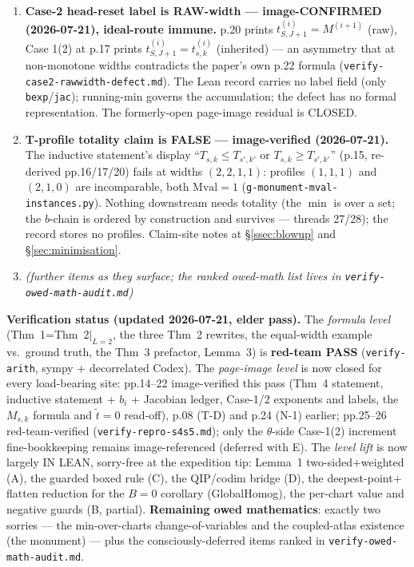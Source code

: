 \documentclass[11pt]{article}
\theoremstyle{plain}
\theoremstyle{definition}
\theoremstyle{remark}
\newcommand{\rorder}{\theta}         %
\newcommand{\Mval}{\mathrm{Mval}}
\begin{document}
\begin{enumerate}
\item[(T-E)] \textbf{Case-2 head-reset label is RAW-width --- image-CONFIRMED
(2026-07-21), ideal-route immune.} p.20 prints $t^{(i)}_{S,J+1}=M^{(i+1)}$ (raw), Case
1(2) at p.17 prints $t^{(i)}_{S,J+1}=t^{(i)}_{s,k}$ (inherited) --- an asymmetry that at
non-monotone widths contradicts the paper's own p.22 formula
(\texttt{verify-case2-rawwidth-defect.md}). The Lean record carries no label field
(only \texttt{bexp}/\texttt{jac}); running-min governs the accumulation; the defect has
no formal representation. The formerly-open page-image residual is CLOSED.
\item[(T-F)] \textbf{T-profile totality claim is FALSE --- image-verified (2026-07-21).}
The inductive statement's display ``$T_{s,k}\le T_{s',k'}$ or $T_{s,k}\ge T_{s',k'}$''
(p.15, re-derived pp.16/17/20) fails at widths $(2,2,1,1)$: profiles $(1,1,1)$ and
$(2,1,0)$ are incomparable, both $\Mval=1$ (\texttt{g-monument-mval-instances.py}).
Nothing downstream needs totality (the $\min$ is over a set; the $b$-chain is ordered by
construction and survives --- threads 27/28); the record stores no profiles. Claim-site
notes at \S\ref{ssec:blowup} and \S\ref{sec:minimisation}.
\item[] \emph{(further items as they surface; the ranked owed-math list lives in
\texttt{verify-owed-math-audit.md})}
\end{enumerate}

\medskip\noindent\textbf{Verification status (updated 2026-07-21, elder pass).} The
\emph{formula level} (Thm~1=Thm~2$|_{L=2}$, the three Thm~2 rewrites, the equal-width
example vs.\ ground truth, the Thm~3 prefactor, Lemma~3) is \textbf{red-team PASS}
(\texttt{verify-arith}, sympy + decorrelated Codex). The \emph{page-image level} is now
closed for every load-bearing site: pp.14--22 image-verified this pass (Thm~4 statement,
inductive statement + $b_i$ + Jacobian ledger, Case-1/2 exponents and labels, the
$M_{s,k}$ formula and $\tilde t=0$ read-off), p.08 (T-D) and p.24 (N-1) earlier;
pp.25--26 red-team-verified (\texttt{verify-repro-s4s5.md}); only the $\rorder$-side
Case-1(2) increment fine-bookkeeping remains image-referenced (deferred with E). The
\emph{level lift} is now largely IN LEAN, sorry-free at the expedition tip: Lemma~1
two-sided$+$weighted (A), the guarded boxed rule (C), the QIP/codim bridge (D), the
deepest-point$+$flatten reduction for the $B=0$ corollary (GlobalHomog), the per-chart
value and negative guards (B, partial). \textbf{Remaining owed mathematics}: exactly two
sorries --- the min-over-charts change-of-variables and the coupled-atlas existence
(the monument) --- plus the consciously-deferred items ranked in
\texttt{verify-owed-math-audit.md}.
\end{document}
